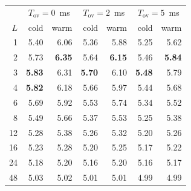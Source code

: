 \begin{tabular}{rrrrrrr}
\toprule
 & \multicolumn{2}{c}{$T_{\mathrm{ov}}=0$~ms} & \multicolumn{2}{c}{$T_{\mathrm{ov}}=2$~ms} & \multicolumn{2}{c}{$T_{\mathrm{ov}}=5$~ms} \\
$L$ & cold & warm & cold & warm & cold & warm \\
\midrule
1 & 5.40 & 6.06 & 5.36 & 5.88 & 5.25 & 5.62 \\
2 & 5.73 & \textbf{6.35} & 5.64 & \textbf{6.15} & 5.46 & \textbf{5.84} \\
3 & \textbf{5.83} & 6.31 & \textbf{5.70} & 6.10 & \textbf{5.48} & 5.79 \\
4 & \textbf{5.82} & 6.18 & 5.66 & 5.97 & 5.44 & 5.68 \\
6 & 5.69 & 5.92 & 5.53 & 5.74 & 5.34 & 5.52 \\
8 & 5.49 & 5.66 & 5.37 & 5.53 & 5.25 & 5.38 \\
12 & 5.28 & 5.38 & 5.26 & 5.32 & 5.20 & 5.26 \\
16 & 5.23 & 5.28 & 5.20 & 5.25 & 5.17 & 5.22 \\
24 & 5.18 & 5.20 & 5.16 & 5.20 & 5.16 & 5.17 \\
48 & 5.03 & 5.02 & 5.01 & 5.01 & 4.99 & 4.99 \\
\bottomrule
\end{tabular}
